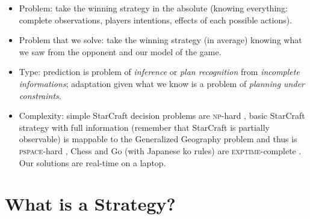 \begin{itemize}
\item Problem: take the winning strategy in the absolute (knowing everything: complete observations, players intentions, effects of each possible actions).
\item Problem that we solve: take the winning strategy (in average) knowing what we saw from the opponent and our model of the game. 
\item Type: prediction is problem of \textit{inference} or \textit{plan recognition} from \textit{incomplete informations}; adaptation given what we know is a problem of \textit{planning under constraints}.
\item Complexity: simple StarCraft decision problems are \textsc{np}-hard \citep{GamingComplexity}, basic StarCraft strategy with full information (remember that StarCraft is partially observable) is mappable to the Generalized Geography problem and thus is \textsc{pspace}-hard \citep{Lichtenstein78}, Chess \citep{Fraenkel81} and Go (with Japanese ko rules) are \textsc{exptime}-complete \citep{Robson83}. Our solutions are real-time on a laptop. %
\end{itemize}

\section{What is a Strategy?}




